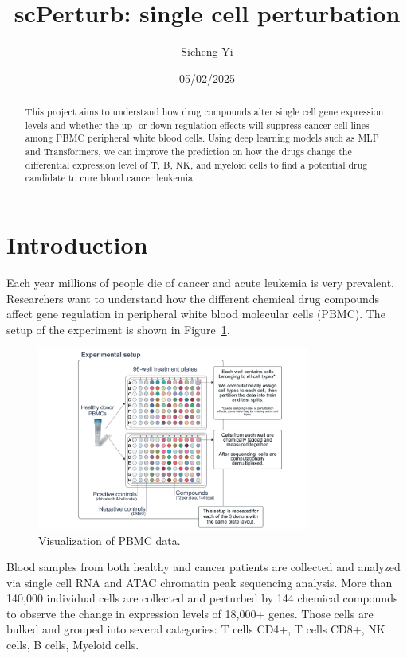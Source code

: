 \documentclass[11pt, oneside]{article}   	%
\title{scPerturb: single cell perturbation}
\author{Sicheng Yi}
\date{05/02/2025}
\begin{document}
\maketitle
\begin{abstract}
This project aims to understand how drug compounds alter single cell gene expression levels and whether the up- or down-regulation effects will suppress cancer cell lines among PBMC peripheral white blood cells. Using deep learning models such as MLP and Transformers, we can improve the prediction on how the drugs change the differential expression level of T, B, NK, and myeloid cells to find a potential drug candidate to cure blood cancer leukemia. 
\end{abstract}


\section*{Introduction}

Each year millions of people die of cancer and acute leukemia is very prevalent. Researchers want to understand how the different chemical drug compounds affect gene regulation in peripheral white blood molecular cells (PBMC). The setup of the experiment is shown in Figure~\ref{fig:pbmc}. 

\begin{figure}[htbp]
  \centering
  \includegraphics[width=0.8\textwidth]{pbmc.png}
  \caption{Visualization of PBMC data.}
  \label{fig:pbmc}
\end{figure}

Blood samples from both healthy and cancer patients are collected and analyzed via single cell RNA and ATAC chromatin peak sequencing analysis. More than 140,000 individual cells are collected and perturbed by 144 chemical compounds to observe the change in expression levels of 18,000+ genes. Those cells are bulked and grouped into several categories: T cells CD4+, T cells CD8+, NK cells, B cells, Myeloid cells. 
\end{document}
